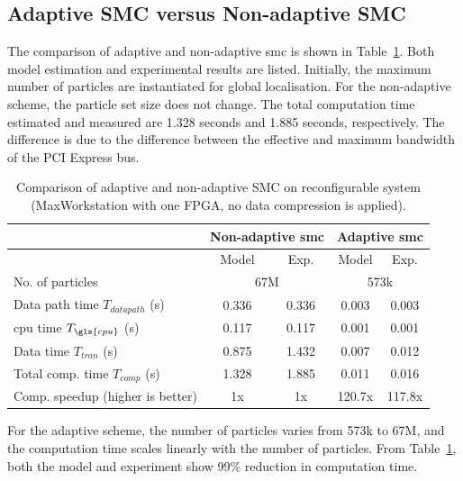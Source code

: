 \subsection{Adaptive SMC versus Non-adaptive SMC}
The comparison of adaptive and non-adaptive \gls{smc} is shown in Table~\ref{tab:smc}.
Both model estimation and experimental results are listed.
Initially, the maximum number of particles are instantiated for global localisation.
For the non-adaptive scheme, the particle set size does not change.
The total computation time estimated and measured are 1.328 seconds and 1.885 seconds, respectively.
The difference is due to the difference between the effective and maximum bandwidth of the PCI Express bus.

\begin{table}[ht]
	\centering
	\setlength{\tabcolsep}{5pt}
	\begin{spacing}{1.0}
	\caption[Comparison of adaptive and non-adaptive SMC on reconfigurable system.]{Comparison of adaptive and non-adaptive SMC on reconfigurable system (MaxWorkstation with one FPGA, no data compression is applied).}
	\label{tab:smc}{
	\smallskip
		\begin{tabular}{l || c c | c c}
			\hline
			 \multirow{2}{*}{}  & \multicolumn{2}{|c|}{Non-adaptive \gls{smc}} & \multicolumn{2}{|c|}{Adaptive \gls{smc}} \\
			\hline
			  & Model & Exp. & Model & Exp. \\
			\hline
			\hline
			 No. of particles & \multicolumn{2}{|c|}{67M} & \multicolumn{2}{|c|}{573k} \\
			\hline
			 Data path time $T_{datapath}$ (s) 		& 0.336 & 0.336 & 0.003 & 0.003 \\
			 \gls{cpu} time $T_{\gls{cpu}}$ (s) 				& 0.117 & 0.117 & 0.001 & 0.001 \\
			 Data time $T_{tran}$ (s) 				& 0.875 & 1.432 & 0.007 & 0.012 \\
			 Total comp. time $T_{comp}$ (s)			& 1.328 & 1.885 & 0.011	& 0.016 \\
			\hline
			 Comp. speedup (higher is better)		& 1x	& 1x	& 120.7x	& 117.8x \\
			\hline
		\end{tabular}
	}
	\end{spacing}
\end{table}

For the adaptive scheme, the number of particles varies from 573k to 67M, and the computation time scales linearly with the number of particles.
From Table~\ref{tab:smc}, both the model and experiment show 99\% reduction in computation time.

